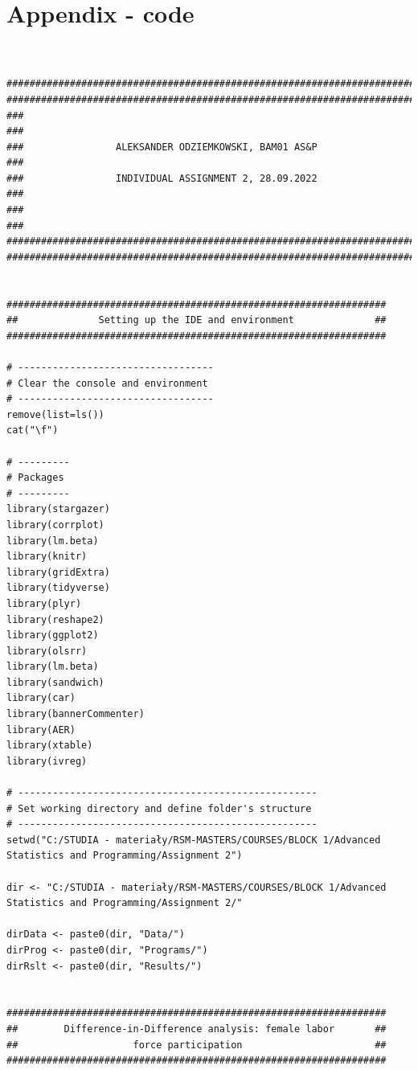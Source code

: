 \documentclass{article}
\begin{document}
\section{Appendix - code}
\begin{tiny}
\begin{verbatim}


############################################################################
############################################################################
###                                                                      ###
###                ALEKSANDER ODZIEMKOWSKI, BAM01 AS&P                   ###
###                INDIVIDUAL ASSIGNMENT 2, 28.09.2022                   ###
###                                                                      ###
############################################################################
############################################################################


##################################################################
##              Setting up the IDE and environment              ##
##################################################################

# ----------------------------------
# Clear the console and environment
# ----------------------------------
remove(list=ls())
cat("\f")

# ---------
# Packages
# ---------
library(stargazer)
library(corrplot)
library(lm.beta)
library(knitr)
library(gridExtra)
library(tidyverse)
library(plyr)
library(reshape2)
library(ggplot2)
library(olsrr)
library(lm.beta)
library(sandwich)
library(car)
library(bannerCommenter)
library(AER)
library(xtable)
library(ivreg)

# ----------------------------------------------------
# Set working directory and define folder's structure
# ----------------------------------------------------
setwd("C:/STUDIA - materiały/RSM-MASTERS/COURSES/BLOCK 1/Advanced Statistics and Programming/Assignment 2")

dir <- "C:/STUDIA - materiały/RSM-MASTERS/COURSES/BLOCK 1/Advanced Statistics and Programming/Assignment 2/"

dirData <- paste0(dir, "Data/")
dirProg <- paste0(dir, "Programs/")
dirRslt <- paste0(dir, "Results/")


##################################################################
##        Difference-in-Difference analysis: female labor       ##
##                    force participation                       ##
##################################################################



\end{verbatim}
\end{tiny}
\end{document}
